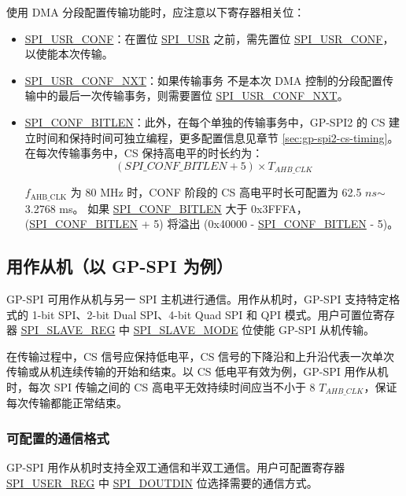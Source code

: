 \documentclass[main\_\_CN.tex]{subfiles}
\begin{document}
使用 DMA 分段配置传输功能时，应注意以下寄存器相关位：
\begin{itemize}
    \item \hyperref[fielddesc:SPIUSRCONF]{SPI\_USR\_CONF}：在置位 \hyperref[fielddesc:SPIUSR]{SPI\_USR} 之前，需先置位 \hyperref[fielddesc:SPIUSRCONF]{SPI\_USR\_CONF}，以使能本次传输。
    \item \hyperref[fielddesc:SPIUSRCONFNXT]{SPI\_USR\_CONF\_NXT}：如果传输事务  不是本次 DMA 控制的分段配置传输中的最后一次传输事务，则需要置位 \hyperref[fielddesc:SPIUSRCONFNXT]{SPI\_USR\_CONF\_NXT}。
    \item \hyperref[fielddesc:SPICONFBITLEN]{SPI\_CONF\_BITLEN}：此外，在每个单独的传输事务中，GP-SPI2 的 CS 建立时间和保持时间可独立编程，更多配置信息见章节 \ref{sec:gp-spi2-cs-timing}。在每次传输事务中，CS 保持高电平的时长约为：
    \[
    (\hyperref[fielddesc:SPICONFBITLEN]{SPI\_CONF\_BITLEN} + 5) \times T_{AHB\_CLK}
    \]

$f_{\textrm{AHB\_CLK}}$  为 80 MHz 时，CONF 阶段的 CS 高电平时长可配置为 62.5 $ns$$\sim$3.2768 ms。
如果 \hyperref[fielddesc:SPICONFBITLEN]{SPI\_CONF\_BITLEN} 大于 0x3FFFA，(\hyperref[fielddesc:SPICONFBITLEN]{SPI\_CONF\_BITLEN} + 5) 将溢出 (0x40000 - \hyperref[fielddesc:SPICONFBITLEN]{SPI\_CONF\_BITLEN} - 5)。 
\end{itemize}

\subsection{用作从机（以 GP-SPI 为例）}\label{sec:gp-spi2-slave-mode}

GP-SPI 可用作从机与另一 SPI 主机进行通信。用作从机时，GP-SPI 支持特定格式的 1-bit SPI、2-bit Dual SPI、4-bit Quad SPI 和 QPI 模式。用户可置位寄存器 \hyperref[regdesc:SPISLAVEREG]{SPI\_SLAVE\_REG} 中 \hyperref[fielddesc:SPISLAVEMODE]{SPI\_SLAVE\_MODE} 位使能 GP-SPI 从机传输。 

在传输过程中，CS 信号应保持低电平，CS 信号的下降沿和上升沿代表一次单次传输或从机连续传输的开始和结束。以 CS 低电平有效为例，GP-SPI 用作从机时，每次 SPI 传输之间的 CS 高电平无效持续时间应当不小于 8 $T_{AHB\_CLK}$，保证每次传输都能正常结束。

\subsubsection{可配置的通信格式}\label{slave communication format}

GP-SPI 用作从机时支持全双工通信和半双工通信。用户可配置寄存器 \hyperref[regdesc:SPIUSERREG]{SPI\_USER\_REG} 中 \hyperref[fielddesc:SPIDOUTDIN]{SPI\_DOUTDIN} 位选择需要的通信方式。
\end{document}
